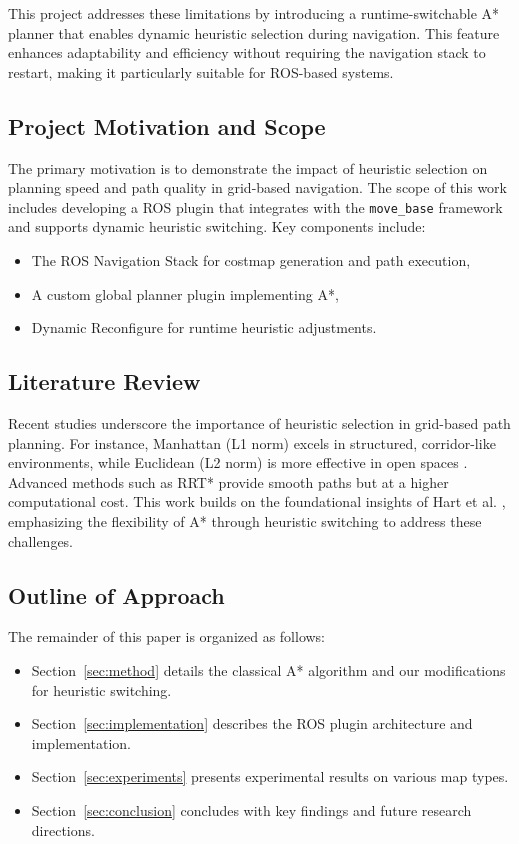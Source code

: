 \documentclass[letterpaper, 10 pt, conference]{ieeeconf}
\begin{document}
This project addresses these limitations by introducing a runtime-switchable A* planner that enables dynamic heuristic selection during navigation. This feature enhances adaptability and efficiency without requiring the navigation stack to restart, making it particularly suitable for ROS-based systems.

\subsection{Project Motivation and Scope}
The primary motivation is to demonstrate the impact of heuristic selection on planning speed and path quality in grid-based navigation. The scope of this work includes developing a ROS plugin that integrates with the \texttt{move\_base} framework and supports dynamic heuristic switching. Key components include:
\begin{itemize}
	\item The ROS Navigation Stack for costmap generation and path execution,
	\item A custom global planner plugin implementing A*,
	\item Dynamic Reconfigure for runtime heuristic adjustments.
\end{itemize}

\subsection{Literature Review}
Recent studies underscore the importance of heuristic selection in grid-based path planning. For instance, Manhattan (L1 norm) excels in structured, corridor-like environments, while Euclidean (L2 norm) is more effective in open spaces \cite{thrun2005probabilistic, lavalle2006planning}. Advanced methods such as RRT* \cite{karaman2011sampling} provide smooth paths but at a higher computational cost. This work builds on the foundational insights of Hart et al. \cite{hart1968formal}, emphasizing the flexibility of A* through heuristic switching to address these challenges.

\subsection{Outline of Approach}
The remainder of this paper is organized as follows:
\begin{itemize}
	\item Section~\ref{sec:method} details the classical A* algorithm and our modifications for heuristic switching.
	\item Section~\ref{sec:implementation} describes the ROS plugin architecture and implementation.
	\item Section~\ref{sec:experiments} presents experimental results on various map types.
	\item Section~\ref{sec:conclusion} concludes with key findings and future research directions.
\end{itemize}
\end{document}
